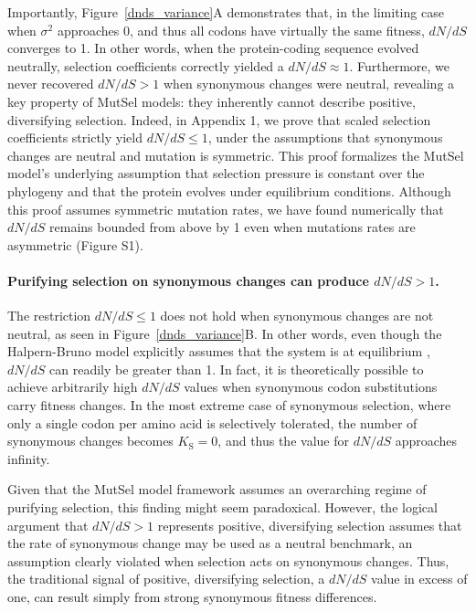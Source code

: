 \documentclass{pnastwo}
\begin{document}
\begin{article}
Importantly, Figure~\ref{dnds_variance}A demonstrates that, in the limiting case when $\sigma^2$ approaches 0, and thus all codons have virtually the same fitness, $dN/dS$ converges to 1. In other words, when the protein-coding sequence evolved neutrally, selection coefficients correctly yielded a $dN/dS \approx 1$. Furthermore, we never recovered $dN/dS > 1$ when synonymous changes were neutral, revealing a key property of MutSel models: they inherently cannot describe positive, diversifying selection. Indeed, in Appendix 1, we prove that scaled selection coefficients strictly yield $dN/dS \leq 1$, under the assumptions that synonymous changes are neutral and mutation is symmetric. This proof formalizes the MutSel model's underlying assumption that selection pressure is constant over the phylogeny and that the protein evolves under equilibrium conditions. Although this proof assumes symmetric mutation rates, we have found numerically that $dN/dS$ remains bounded from above by 1 even when mutations rates are asymmetric (Figure S1).

\paragraph{Purifying selection on synonymous changes can produce $dN/dS>1$.}

The restriction $dN/dS \leq 1$ does not hold when synonymous changes are not neutral, as seen in Figure~\ref{dnds_variance}B. In other words, even though the Halpern-Bruno model explicitly assumes that the system is at equilibrium \cite{HalpernBruno1998,Thorne2012}, $dN/dS$ can readily be greater than 1. In fact, it is theoretically possible to achieve arbitrarily high $dN/dS$ values when synonymous codon substitutions carry fitness changes. In the most extreme case of synonymous selection, where only a single codon per amino acid is selectively tolerated, the number of synonymous changes becomes $K_\text{S} = 0$, and thus the value for $dN/dS$ approaches infinity. 

Given that the MutSel model framework assumes an overarching regime of purifying selection, this finding might seem paradoxical. However, the logical argument that $dN/dS > 1$ represents positive, diversifying selection assumes that the rate of synonymous change may be used as a neutral benchmark, an assumption clearly violated when selection acts on synonymous changes. Thus, the traditional signal of positive, diversifying selection, a $dN/dS$ value in excess of one, can result simply from strong synonymous fitness differences. 


\end{article}
\end{document}
